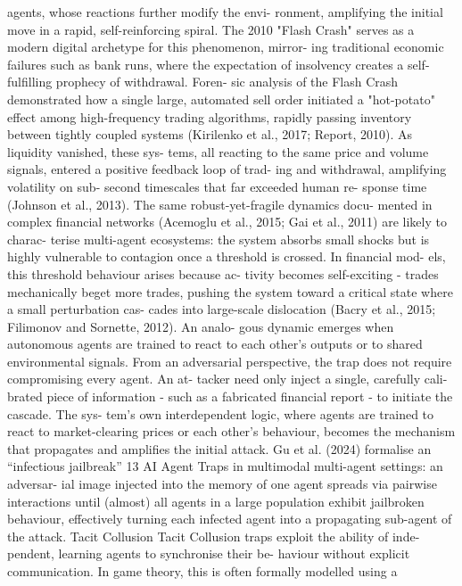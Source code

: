 agents, whose reactions further modify the envi-
ronment, amplifying the initial move in a rapid,
self-reinforcing spiral.
The 2010 "Flash Crash" serves as a modern
digital archetype for this phenomenon, mirror-
ing traditional economic failures such as bank
runs, where the expectation of insolvency creates
a self-fulfilling prophecy of withdrawal. Foren-
sic analysis of the Flash Crash demonstrated how
a single large, automated sell order initiated a
"hot-potato" effect among high-frequency trading
algorithms, rapidly passing inventory between
tightly coupled systems (Kirilenko et al., 2017;
Report, 2010). As liquidity vanished, these sys-
tems, all reacting to the same price and volume
signals, entered a positive feedback loop of trad-
ing and withdrawal, amplifying volatility on sub-
second timescales that far exceeded human re-
sponse time (Johnson et al., 2013).
The same robust-yet-fragile dynamics docu-
mented in complex financial networks (Acemoglu
et al., 2015; Gai et al., 2011) are likely to charac-
terise multi-agent ecosystems: the system absorbs
small shocks but is highly vulnerable to contagion
once a threshold is crossed. In financial mod-
els, this threshold behaviour arises because ac-
tivity becomes self-exciting - trades mechanically
beget more trades, pushing the system toward
a critical state where a small perturbation cas-
cades into large-scale dislocation (Bacry et al.,
2015; Filimonov and Sornette, 2012). An analo-
gous dynamic emerges when autonomous agents
are trained to react to each other’s outputs or to
shared environmental signals.
From an adversarial perspective, the trap does
not require compromising every agent. An at-
tacker need only inject a single, carefully cali-
brated piece of information - such as a fabricated
financial report - to initiate the cascade. The sys-
tem’s own interdependent logic, where agents are
trained to react to market-clearing prices or each
other’s behaviour, becomes the mechanism that
propagates and amplifies the initial attack. Gu
et al. (2024) formalise an “infectious jailbreak”
13
AI Agent Traps
in multimodal multi-agent settings: an adversar-
ial image injected into the memory of one agent
spreads via pairwise interactions until (almost)
all agents in a large population exhibit jailbroken
behaviour, effectively turning each infected agent
into a propagating sub-agent of the attack.
Tacit Collusion
Tacit Collusion traps exploit the ability of inde-
pendent, learning agents to synchronise their be-
haviour without explicit communication. In game
theory, this is often formally modelled using a
